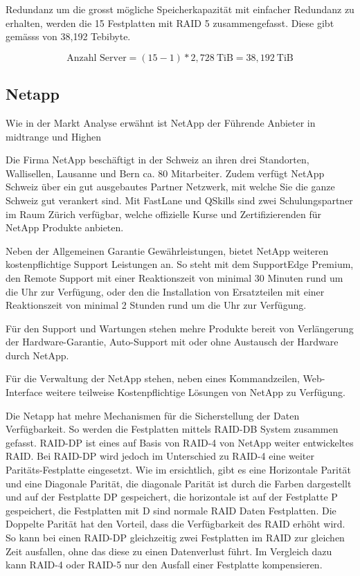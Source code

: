 Redundanz um die grosst mögliche Speicherkapazität mit einfacher Redundanz zu erhalten, werden die 15 Festplatten mit RAID 5 zusammengefasst. Diese gibt gemässs  von 38,192 Tebibyte.


\begin{equation}
\mbox{Anzahl Server} = (15 -1)* 2,728 \mathrm{\ TiB}=  38,192 \mathrm{\ TiB}
\label{eqn:MaxSpeicherkapazitätHeztner}
\end{equation}

\subsection{Netapp}

Wie in der Markt Analyse erwähnt ist NetApp der Führende Anbieter in midtrange und Highen

Die Firma NetApp beschäftigt in  der Schweiz an ihren drei Standorten, Wallisellen, Lausanne und Bern ca. 80 Mitarbeiter. Zudem verfügt NetApp Schweiz über ein gut ausgebautes Partner Netzwerk, mit welche Sie die ganze Schweiz gut verankert sind. Mit FastLane und QSkills sind zwei Schulungspartner im Raum Zürich verfügbar, welche offizielle Kurse und Zertifizierenden für NetApp Produkte anbieten. 

Neben der Allgemeinen Garantie Gewährleistungen, bietet NetApp weiteren kostenpflichtige Support Leistungen an. So steht mit dem SupportEdge Premium, den Remote Support mit einer Reaktionszeit von minimal 30 Minuten rund um die Uhr zur Verfügung, oder den die Installation von Ersatzteilen mit einer Reaktionszeit von minimal 2 Stunden rund um die Uhr zur Verfügung. 

Für den Support und Wartungen stehen mehre Produkte bereit von Verlängerung der Hardware-Garantie, Auto-Support mit oder ohne Austausch der Hardware durch NetApp.


Für die Verwaltung der NetApp stehen, neben eines Kommandzeilen, Web-Interface weitere teilweise Kostenpflichtige Lösungen von NetApp zu Verfügung. 

Die Netapp hat mehre Mechanismen für die Sicherstellung der Daten Verfügbarkeit. So werden die Festplatten mittels RAID-DB System zusammen gefasst. RAID-DP ist eines  auf Basis von RAID-4 von NetApp weiter entwickeltes RAID. Bei RAID-DP wird jedoch im Unterschied zu RAID-4 eine weiter Paritäts-Festplatte eingesetzt. Wie im  ersichtlich, gibt es eine Horizontale Parität und eine Diagonale Parität, die diagonale Parität ist durch die Farben dargestellt und auf der Festplatte DP gespeichert, die horizontale ist auf der Festplatte P gespeichert, die Festplatten mit D sind normale RAID Daten Festplatten. Die Doppelte Parität hat den Vorteil, dass die Verfügbarkeit des RAID erhöht wird. So kann bei einen RAID-DP gleichzeitig zwei Festplatten im RAID zur gleichen Zeit ausfallen, ohne das diese zu einen Datenverlust führt. Im Vergleich dazu kann RAID-4 oder RAID-5 nur den Ausfall einer Festplatte kompensieren.\cite{White2010}

